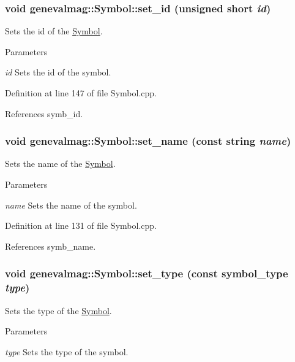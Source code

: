 \hypertarget{classgenevalmag_1_1Symbol_a997ca15803cde32380834a029d3609a7}{
\subsubsection[{set\_\-id}]{\setlength{\rightskip}{0pt plus 5cm}void genevalmag::Symbol::set\_\-id (unsigned short {\em id})}}
\label{classgenevalmag_1_1Symbol_a997ca15803cde32380834a029d3609a7}
Sets the id of the \hyperlink{classgenevalmag_1_1Symbol}{Symbol}. 
\begin{DoxyParams}{Parameters}
\item[{\em id}]Sets the id of the symbol. \end{DoxyParams}


Definition at line 147 of file Symbol.cpp.



References symb\_\-id.

\hypertarget{classgenevalmag_1_1Symbol_a257b4ff2e26d8c15d33e9ac6194f44fb}{
\subsubsection[{set\_\-name}]{\setlength{\rightskip}{0pt plus 5cm}void genevalmag::Symbol::set\_\-name (const string {\em name})}}
\label{classgenevalmag_1_1Symbol_a257b4ff2e26d8c15d33e9ac6194f44fb}
Sets the name of the \hyperlink{classgenevalmag_1_1Symbol}{Symbol}. 
\begin{DoxyParams}{Parameters}
\item[{\em name}]Sets the name of the symbol. \end{DoxyParams}


Definition at line 131 of file Symbol.cpp.



References symb\_\-name.

\hypertarget{classgenevalmag_1_1Symbol_a3c15ef8b10ef26b663a6eca6c2b81d7f}{
\subsubsection[{set\_\-type}]{\setlength{\rightskip}{0pt plus 5cm}void genevalmag::Symbol::set\_\-type (const {\bf symbol\_\-type} {\em type})}}
\label{classgenevalmag_1_1Symbol_a3c15ef8b10ef26b663a6eca6c2b81d7f}
Sets the type of the \hyperlink{classgenevalmag_1_1Symbol}{Symbol}. 
\begin{DoxyParams}{Parameters}
\item[{\em type}]Sets the type of the symbol. \end{DoxyParams}


